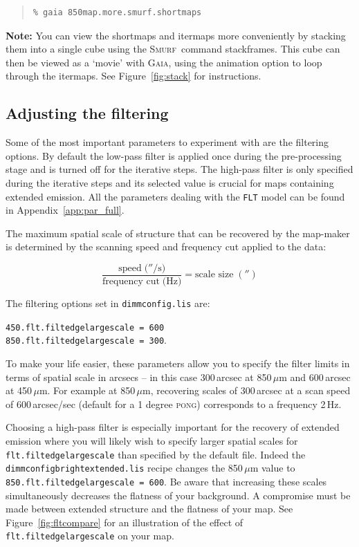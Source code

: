 \documentclass[twoside,11pt]{article}
\newcommand{\htmlref}[2]{#1}
\newcommand{\latexhtml}[2]{#1}
\newcommand{\xref}[3]{#1}
\newcommand{\xlabel}[1]{}
\renewcommand{\_}{\texttt{\symbol{95}}}
\newenvironment{myquote}{\begin{quote}\begin{small}}{\end{small}\end{quote}}
\newcommand{\gaia}{\xref{\textsc{Gaia}}{sun214}{}}
\newcommand{\smurf}{\xref{\textsc{Smurf}}{sun258}{}}
\newcommand{\task}[1]{\textsf{#1}}
\newcommand{\stackframes}{\xref{\task{stackframes}}{sun258}{STACKFRAMES}}
\newcommand{\cref}[3]{\latexhtml{#1~\ref{#2}}{\htmlref{#3}{#2}}}
\begin{document}
\begin{myquote}
\begin{verbatim}
% gaia 850map.more.smurf.shortmaps
\end{verbatim}
\end{myquote}

\textbf{Note:} You can view the shortmaps and itermaps more
conveniently by stacking them into a single cube using the \smurf\
command \stackframes. This cube can then be viewed as a
`movie' with \gaia, using the animation option to loop through the
itermaps. See \cref{Figure}{fig:stack}{the box above} for instructions.

\subsection{\xlabel{filt}Adjusting the filtering}
\label{sec:filt}

Some of the most important parameters to experiment with are the
filtering options. By default the low-pass filter is applied once
during the pre-processing stage and is turned off for the iterative
steps. The high-pass filter is only specified during the iterative
steps and its selected value is crucial for maps containing extended
emission.  All the parameters dealing with the \texttt{FLT} model can
be found in \cref{Appendix}{app:par_full}{this appendix}.

The maximum spatial scale of structure that can be recovered by the
map-maker is determined by the scanning speed and frequency cut
applied to the data:

\begin{equation}
\frac{\mbox{speed}\;(''/\mbox{s)}}{\mbox{frequency cut}\;(\mbox{Hz)}}=\mbox{scale size}\;('')
\end{equation}

The filtering options set in \texttt{dimmconfig.lis} are:

\texttt{450.flt.filt\_edge\_largescale = 600} \\
\texttt{850.flt.filt\_edge\_largescale = 300}.

To make your life easier, these parameters allow you to specify the
filter limits in terms of spatial scale in arcsecs -- in this case
300\,arcsec at 850\,$\mu$m and 600\,arcsec at 450\,$\mu$m. For example
at 850\,$\mu$m, recovering scales of 300\,arcsec at a scan speed of
600\,arcsec/sec (default for a 1 degree \textsc{pong}) corresponds to
a frequency 2\,Hz.

Choosing a high-pass filter is especially important for the recovery
of extended emission where you will likely wish to specify larger
spatial scales for \texttt{flt.filt\_edge\_largescale} than specified
by the default file. Indeed the
\texttt{dimmconfig\_bright\_extended.lis} recipe changes the
850\,$\mu$m value to \texttt{850.flt.filt\_edge\_largescale = 600}. Be
aware that increasing these scales simultaneously decreases the
flatness of your background. A compromise must be made between
extended structure and the flatness of your map. See
\cref{Figure}{fig:fltcompare}{the figure below} for an illustration of
the effect of \texttt{flt.filt\_edge\_largescale} on your map.
\end{document}
